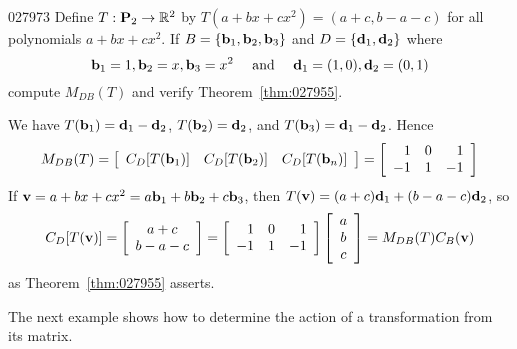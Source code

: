\begin{example}{}{027973}
Define $T : \textbf{P}_{2} \to \mathbb{R}^2$ by $T(a + bx + cx^{2}) = (a + c, b - a - c)$ for all polynomials $a + bx + cx^{2}$. If $B = \{\textbf{b}_{1}, \textbf{b}_{2}, \textbf{b}_{3}\}$ and $D = \{\textbf{d}_{1}, \textbf{d}_{2}\}$ where
\begin{equation*}
\textbf{b}_1 = 1, \textbf{b}_2 = x, \textbf{b}_3 = x^2 \quad \mbox{ and } \quad \textbf{d}_1 = (1, 0), \textbf{d}_2 = (0, 1)
\end{equation*}
compute $M_{DB}(T)$ and verify Theorem~\ref{thm:027955}.


\begin{solution}
We have $T(\textbf{b}_{1}) = \textbf{d}_{1} - \textbf{d}_{2}$, $T(\textbf{b}_{2}) = \textbf{d}_{2}$, and $T(\textbf{b}_{3}) = \textbf{d}_{1} - \textbf{d}_{2}$. Hence
\begin{equation*}
  M_{DB}(T) = \left[
\begin{array}{ccc}
 C_D[T(\textbf{b}_1)] & C_D[T(\textbf{b}_2)] & C_D[T(\textbf{b}_n)] 
\end{array}\right] = \left[ \begin{array}{rrr} 1 & 0 & 1 \\ -1 & 1 & -1 \end{array} \right]
\end{equation*}
If $\textbf{v} = a + bx + cx^{2} = a\textbf{b}_{1} + b\textbf{b}_{2} + c\textbf{b}_{3}$, then $T(\textbf{v}) = (a + c)\textbf{d}_{1} + (b - a - c)\textbf{d}_{2}$, so
\begin{equation*}
C_D[T(\textbf{v})] = \left[ \begin{array}{c} a + c \\ b - a - c \end{array} \right] = \left[ \begin{array}{rrr} 1 & 0 & 1 \\ -1 & 1 & -1 \end{array} \right] \left[ \begin{array}{c} a \\ b \\ c \end{array} \right] = M_{DB}(T)C_B(\textbf{v})
\end{equation*}
as Theorem~\ref{thm:027955} asserts.
\end{solution}
\end{example}

The next example shows how to determine the action of a transformation from its matrix.


